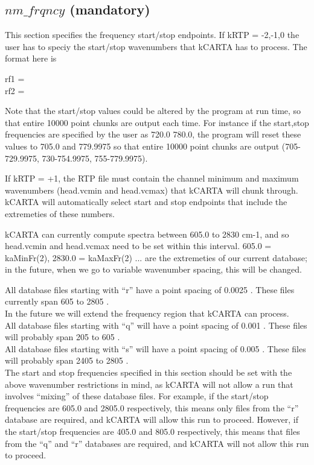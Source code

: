 \documentclass[12pt]{article}
\newcommand{\kc}{\textsf{kCARTA}\xspace}
\newcommand{\ttab}{\indent\indent}
\begin{document}
\subsection{$nm\_frqncy$ (mandatory)}

This section specifies the frequency start/stop endpoints.  If kRTP = -2,-1,0 
the user has to speciy the start/stop wavenumbers that kCARTA has to process. 
The format here is

\medskip
{\sf
\ttab rf1 =  \\
\ttab rf2 = 
}
\medskip

Note that the start/stop values could be altered by the program at
run time, so that entire 10000 point chunks are output each time.  
For instance if the start,stop frequencies are specified by the user
as 720.0 780.0, the program will reset these values to 705.0 and
779.9975 so that entire 10000 point chunks are output (705-729.9975,
730-754.9975, 755-779.9975).

If kRTP = +1, the RTP file must contain the channel minimum and maximum 
wavenumbers (head.vcmin and head.vcmax) that \kc will chunk through. \kc will 
automatically select start and stop endpoints that include the extremeties of 
these numbers.

\kc can currently compute spectra between 605.0 to 2830 cm-1, and so 
head.vcmin and head.vcmax need to be set within this interval. 
605.0 = kaMinFr(2),  2830.0 = kaMaxFr(2) ... are the extremeties of our 
current database; in the future, when we go to variable wavenumber spacing, 
this will be changed. 

All database files starting with ``r'' have a point spacing of 0.0025 \wn.
These files currently span 605 to 2805 \wn.\\

In the future we will extend the frequency region that kCARTA can process.\\
All database files starting with ``q'' will have a point spacing of 0.001 \wn.
These files will probably span 205 to 605 \wn.\\
All database files starting with ``s'' will have a point spacing of 0.005 \wn.
These files will probably span 2405 to 2805 \wn.\\

The start and stop frequencies specified in this section should be set 
with the above wavenumber restrictions in mind, as kCARTA will not allow a run
that involves ``mixing'' of these database files. For example, if the 
start/stop frequencies are 605.0 and 2805.0 respectively, this means only files
from the ``r'' database are required, and kCARTA will allow this run to 
proceed. However, if the 
start/stop frequencies are 405.0 and 805.0 respectively, this means that files
from the ``q'' and ``r'' databases are required, and kCARTA will not allow 
this run to proceed. 
\end{document}
